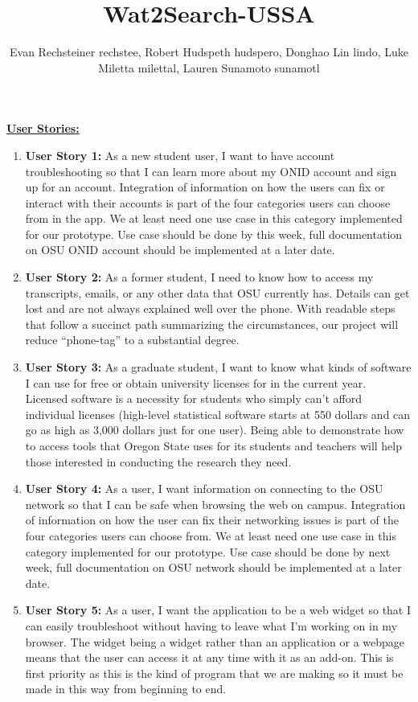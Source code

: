 \documentclass[12pt, letterpaper]{article}
\title{Wat2Search-USSA}
\author{Evan Rechsteiner rechstee, Robert Hudspeth hudspero, Donghao Lin lindo, Luke Miletta milettal, Lauren Sunamoto sunamotl 
}
\begin{document}
	\maketitle
	\underline{\textbf{User Stories:}}
	\begin{enumerate}
		\item \textbf{User Story 1:}
		As a new student user, I want to have account troubleshooting so that I can learn more about my ONID account and sign up for an account. Integration of information on how the users can fix or interact with their accounts is part of the four categories users can choose from in the app. We at least need one use case in this category implemented for our prototype. Use case should be done by this week, full documentation on OSU ONID account should be implemented at a later date.
		\item \textbf{User Story 2:}
		As a former student, I need to know how to access my transcripts, emails, or any other data that OSU currently has. Details can get lost and are not always explained well over the phone. With readable steps that follow a succinct path summarizing the circumstances, our project will reduce “phone-tag” to a substantial degree.
		\item \textbf{User Story 3:}
		As a graduate student, I want to know what kinds of software I can use for free or obtain university licenses for in the current year. Licensed software is a necessity for students who simply can’t afford individual licenses (high-level statistical software starts at 550 dollars and can go as high as 3,000 dollars just for one user). Being able to demonstrate how to access tools that Oregon State uses for its students and teachers will help those interested in conducting the research they need.
		\item \textbf{User Story 4:}
		As a user, I want information on connecting to the OSU network so that I can be safe when browsing the web on campus. Integration of information on how the user can fix their networking issues is part of the four categories users can choose from. We at least need one use case in this category implemented for our prototype. Use case should be done by next week, full documentation on OSU network should be implemented at a later date.
		\item \textbf{User Story 5:}
		As a user, I want the application to be a web widget so that I can easily troubleshoot without having to leave what I’m working on in my browser. The widget being a widget rather than an application or a webpage means that the user can access it at any time with it as an add-on. This is first priority as this is the kind of program that we are making so it must be made in this way from beginning to end.

\end{enumerate}
\end{document}
